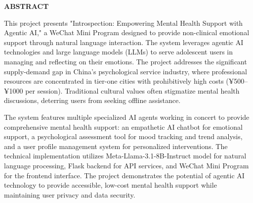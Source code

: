 \begin{center}
    \vspace*{2cm}
    {\Large \textbf{ABSTRACT}}\\[1cm]
\end{center}

This project presents "Introspection: Empowering Mental Health Support with Agentic AI," a WeChat Mini Program designed to provide non-clinical emotional support through natural language interaction. The system leverages agentic AI technologies and large language models (LLMs) to serve adolescent users in managing and reflecting on their emotions. The project addresses the significant supply-demand gap in China's psychological service industry, where professional resources are concentrated in tier-one cities with prohibitively high costs (¥500–¥1000 per session). Traditional cultural values often stigmatize mental health discussions, deterring users from seeking offline assistance.

The system features multiple specialized AI agents working in concert to provide comprehensive mental health support: an empathetic AI chatbot for emotional support, a psychological assessment tool for mood tracking and trend analysis, and a user profile management system for personalized interventions. The technical implementation utilizes Meta-Llama-3.1-8B-Instruct model for natural language processing, Flask backend for API services, and WeChat Mini Program for the frontend interface. The project demonstrates the potential of agentic AI technology to provide accessible, low-cost mental health support while maintaining user privacy and data security.

\newpage 